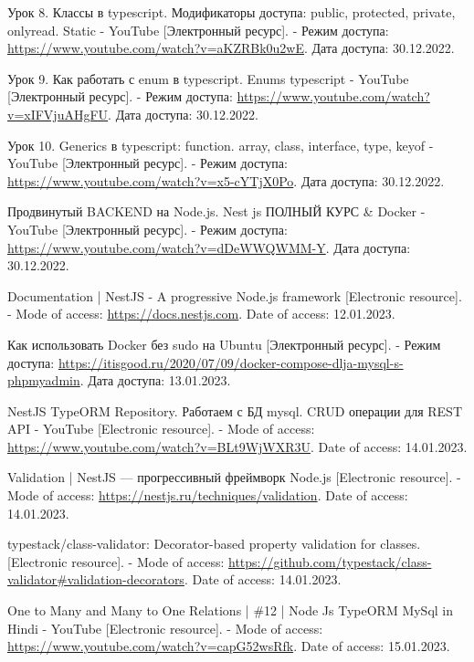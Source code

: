 \documentclass[12pt, a4paper, simple]{eskdtext}
\begin{document}
\begin{thebibliography}{}
    Урок 8. Классы в typescript. Модификаторы доступа: public, protected, private, onlyread. Static - YouTube
    [Электронный ресурс]. -
    Режим доступа:
    \url{https://www.youtube.com/watch?v=aKZRBk0u2wE}.
    Дата доступа: 30.12.2022.

    Урок 9. Как работать с enum в typescript. Enums typescript - YouTube
    [Электронный ресурс]. -
    Режим доступа:
    \url{https://www.youtube.com/watch?v=xIFVjuAHgFU}.
    Дата доступа: 30.12.2022.

    Урок 10. Generics в typescript: function. array, class, interface, type, keyof - YouTube
    [Электронный ресурс]. -
    Режим доступа:
    \url{https://www.youtube.com/watch?v=x5-cYTjX0Po}.
    Дата доступа: 30.12.2022.

    Продвинутый BACKEND на Node.js. Nest js ПОЛНЫЙ КУРС \& Docker - YouTube
    [Электронный ресурс]. -
    Режим доступа:
    \url{https://www.youtube.com/watch?v=dDeWWQWMM-Y}.
    Дата доступа: 30.12.2022.

    Documentation | NestJS - A progressive Node.js framework
    [Electronic resource]. -
    Mode of access:
    \url{https://docs.nestjs.com}.
    Date of access: 12.01.2023.

    Как использовать Docker без sudo на Ubuntu
    [Электронный ресурс]. -
    Режим доступа:
    \url{https://itisgood.ru/2020/07/09/docker-compose-dlja-mysql-s-phpmyadmin}.
    Дата доступа: 13.01.2023.

    NestJS TypeORM Repository. Работаем с БД mysql. CRUD операции для REST API - YouTube
    [Electronic resource]. -
    Mode of access:
    \url{https://www.youtube.com/watch?v=BLt9WjWXR3U}.
    Date of access: 14.01.2023.

    Validation | NestJS — прогрессивный фреймворк Node.js
    [Electronic resource]. -
    Mode of access:
    \url{https://nestjs.ru/techniques/validation}.
    Date of access: 14.01.2023.

    typestack/class-validator: Decorator-based property validation for classes.
    [Electronic resource]. -
    Mode of access:
    \url{https://github.com/typestack/class-validator#validation-decorators}.
    Date of access: 14.01.2023.

    One to Many and Many to One Relations | \#12 | Node Js TypeORM MySql in Hindi - YouTube
    [Electronic resource]. -
    Mode of access:
    \url{https://www.youtube.com/watch?v=capG52wsRfk}.
    Date of access: 15.01.2023.


\end{thebibliography}
\end{document}
